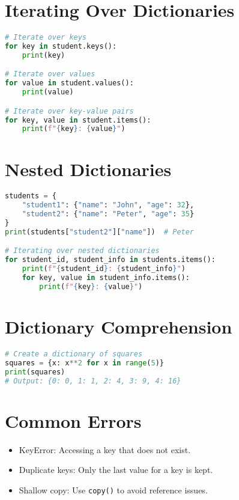 \section{Iterating Over Dictionaries}

\begin{lstlisting}[language=Python]
# Iterate over keys
for key in student.keys():
    print(key)

# Iterate over values
for value in student.values():
    print(value)

# Iterate over key-value pairs
for key, value in student.items():
    print(f"{key}: {value}")
\end{lstlisting}

\section{Nested Dictionaries}

\begin{lstlisting}[language=Python]
students = {
    "student1": {"name": "John", "age": 32},
    "student2": {"name": "Peter", "age": 35}
}
print(students["student2"]["name"])  # Peter

# Iterating over nested dictionaries
for student_id, student_info in students.items():
    print(f"{student_id}: {student_info}")
    for key, value in student_info.items():
        print(f"{key}: {value}")
\end{lstlisting}

\section{Dictionary Comprehension}

\begin{lstlisting}[language=Python]
# Create a dictionary of squares
squares = {x: x**2 for x in range(5)}
print(squares)
# Output: {0: 0, 1: 1, 2: 4, 3: 9, 4: 16}
\end{lstlisting}

\section{Common Errors}

\begin{itemize}
    \item KeyError: Accessing a key that does not exist.
    \item Duplicate keys: Only the last value for a key is kept.
    \item Shallow copy: Use \texttt{copy()} to avoid reference issues.
\end{itemize}

